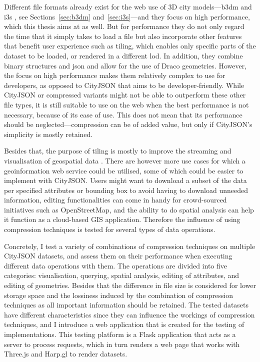 Different file formats already exist for the web use of 3D city models---\ac{b3dm} and \ac{i3s} \citep{b3dm, i3sspecsmain}, see Sections~\ref{sec:b3dm} and~\ref{sec:i3s}---and they focus on high performance, which this thesis aims at as well.
But for performance they do not only regard the time that it simply takes to load a file but also incorporate other features that benefit user experience such as tiling, which enables only specific parts of the dataset to be loaded, or rendered in a different \ac{lod}.
In addition, they combine binary structures and \ac{json} and allow for the use of Draco geometries.
However, the focus on high performance makes them relatively complex to use for developers, as opposed to CityJSON that aims to be developer-friendly.
While CityJSON or compressed variants might not be able to outperform these other file types, it is still suitable to use on the web when the best performance is not necessary, because of its ease of use.
This does not mean that its performance should be neglected---compression can be of added value, but only if CityJSON's simplicity is mostly retained.

Besides that, the purpose of tiling is mostly to improve the streaming and visualisation of geospatial data \citep{3dtiles}.
There are however more use cases for which a geoinformation web service could be utilised, some of which could be easier to implement with CityJSON.
Users might want to download a subset of the data per specified attributes or bounding box to avoid having to download unneeded information, editing functionalities can come in handy for crowd-sourced initiatives such as OpenStreetMap, and the ability to do spatial analysis can help it function as a cloud-based GIS application.
Therefore the influence of using compression techniques is tested for several types of data operations.

Concretely, I test a variety of combinations of compression techniques on multiple CityJSON datasets, and assess them on their performance when executing different data operations with them.
The operations are divided into five categories: visualisation, querying, spatial analysis, editing of attributes, and editing of geometries.
Besides that the difference in file size is considered for lower storage space and the lossiness induced by the combination of compression techniques as all important information should be retained.
The tested datasets have different characteristics since they can influence the workings of compression techniques, and I introduce a web application that is created for the testing of implementations.
This testing platform is a Flask application that acts as a server to process requests, which in turn renders a web page that works with Three.js and Harp.gl to render datasets.



